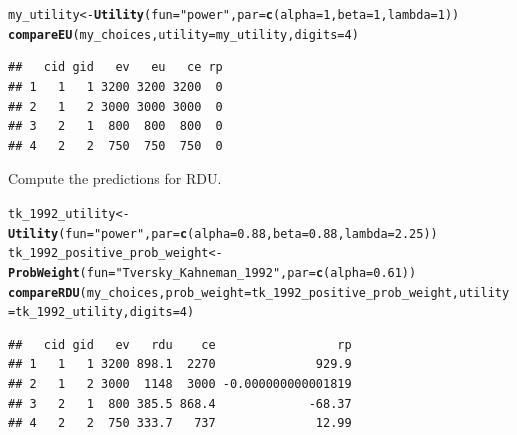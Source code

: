 \documentclass{article}\usepackage[]{graphicx}\usepackage[]{color}
\makeatletter
\newcommand{\hlnum}[1]{\textcolor[rgb]{0.686,0.059,0.569}{#1}}%
\newcommand{\hlstr}[1]{\textcolor[rgb]{0.192,0.494,0.8}{#1}}%
\newcommand{\hlstd}[1]{\textcolor[rgb]{0.345,0.345,0.345}{#1}}%
\newcommand{\hlkwb}[1]{\textcolor[rgb]{0.69,0.353,0.396}{#1}}%
\newcommand{\hlkwc}[1]{\textcolor[rgb]{0.333,0.667,0.333}{#1}}%
\newcommand{\hlkwd}[1]{\textcolor[rgb]{0.737,0.353,0.396}{\textbf{#1}}}%
\newenvironment{kframe}{%
 \def\at@end@of@kframe{}%
 \ifinner\ifhmode%
  \def\at@end@of@kframe{\end{minipage}}%
  \begin{minipage}{\columnwidth}%
 \fi\fi%
 \def\FrameCommand##1{\hskip\@totalleftmargin \hskip-\fboxsep
 \colorbox{shadecolor}{##1}\hskip-\fboxsep
     \hskip-\linewidth \hskip-\@totalleftmargin \hskip\columnwidth}%
 \MakeFramed {\advance\hsize-\width
   \@totalleftmargin\z@ \linewidth\hsize
   \@setminipage}}%
 {\par\unskip\endMakeFramed%
 \at@end@of@kframe}
\newenvironment{knitrout}{}{} %
\makeatother
\begin{document}
\begin{knitrout}
\color{fgcolor}\begin{kframe}
\begin{alltt}
\hlstd{my_utility} \hlkwb{<-} \hlkwd{Utility}\hlstd{(}\hlkwc{fun}\hlstd{=}\hlstr{"power"}\hlstd{,} \hlkwc{par}\hlstd{=}\hlkwd{c}\hlstd{(}\hlkwc{alpha}\hlstd{=}\hlnum{1}\hlstd{,} \hlkwc{beta}\hlstd{=}\hlnum{1}\hlstd{,} \hlkwc{lambda}\hlstd{=}\hlnum{1}\hlstd{))}
\hlkwd{compareEU}\hlstd{(my_choices,} \hlkwc{utility}\hlstd{=my_utility,} \hlkwc{digits}\hlstd{=}\hlnum{4}\hlstd{)}
\end{alltt}
\begin{verbatim}
##   cid gid   ev   eu   ce rp
## 1   1   1 3200 3200 3200  0
## 2   1   2 3000 3000 3000  0
## 3   2   1  800  800  800  0
## 4   2   2  750  750  750  0
\end{verbatim}
\end{kframe}
\end{knitrout}


Compute the predictions for RDU.

\begin{knitrout}
\color{fgcolor}\begin{kframe}
\begin{alltt}
\hlstd{tk_1992_utility} \hlkwb{<-} \hlkwd{Utility}\hlstd{(}\hlkwc{fun}\hlstd{=}\hlstr{"power"}\hlstd{,} \hlkwc{par}\hlstd{=}\hlkwd{c}\hlstd{(}\hlkwc{alpha}\hlstd{=}\hlnum{0.88}\hlstd{,} \hlkwc{beta}\hlstd{=}\hlnum{0.88}\hlstd{,} \hlkwc{lambda}\hlstd{=}\hlnum{2.25}\hlstd{))}
\hlstd{tk_1992_positive_prob_weight} \hlkwb{<-} \hlkwd{ProbWeight}\hlstd{(}\hlkwc{fun}\hlstd{=}\hlstr{"Tversky_Kahneman_1992"}\hlstd{,} \hlkwc{par}\hlstd{=}\hlkwd{c}\hlstd{(}\hlkwc{alpha}\hlstd{=}\hlnum{0.61}\hlstd{))}
\hlkwd{compareRDU}\hlstd{(my_choices,} \hlkwc{prob_weight}\hlstd{=tk_1992_positive_prob_weight,} \hlkwc{utility}\hlstd{=tk_1992_utility,} \hlkwc{digits}\hlstd{=}\hlnum{4}\hlstd{)}
\end{alltt}
\begin{verbatim}
##   cid gid   ev   rdu    ce                 rp
## 1   1   1 3200 898.1  2270              929.9
## 2   1   2 3000  1148  3000 -0.000000000001819
## 3   2   1  800 385.5 868.4             -68.37
## 4   2   2  750 333.7   737              12.99
\end{verbatim}
\end{kframe}
\end{knitrout}
\end{document}
